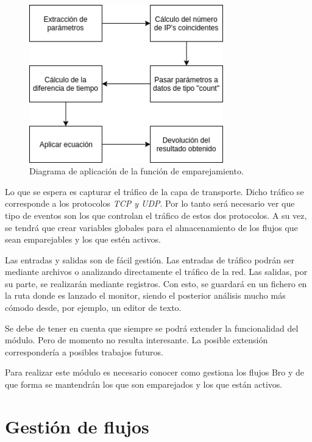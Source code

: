\begin{figure}[H]
  \includegraphics[width=0.75\textwidth]{imagenes/emparejamiento.png}
  \centering
  \caption{Diagrama de aplicación de la función de emparejamiento.}\label{fig.emparejamiento}
\end{figure}


\intro Lo que se espera es capturar el tráfico de la capa de transporte. Dicho tráfico se corresponde a los 
protocolos \textit{TCP y UDP}. Por lo tanto será necesario ver que tipo de eventos son los que controlan el tráfico 
de estos dos protocolos. A su vez, se tendrá que crear variables globales para el almacenamiento de los flujos que sean emparejables 
y los que estén activos.

\intro Las entradas y salidas son de fácil gestión. Las entradas de tráfico podrán ser mediante archivos o 
analizando directamente el tráfico de la red. Las salidas, por su parte, se realizarán mediante registros. Con esto, se guardará en un fichero en la ruta donde es lanzado el monitor, siendo el posterior análisis mucho más cómodo desde, por ejemplo, un editor de texto.

\intro Se debe de tener en cuenta que siempre se podrá extender la funcionalidad del módulo. Pero de momento no 
resulta interesante. La posible extensión correspondería a posibles trabajos futuros.

\intro Para realizar este módulo es necesario conocer como gestiona los flujos Bro y de que forma se mantendrán 
los que son emparejados y los que están activos.

\section{Gestión de flujos}

